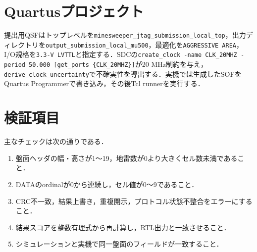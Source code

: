 \section{Quartusプロジェクト}
提出用QSFはトップレベルを\texttt{minesweeper\_jtag\_submission\_local\_top}，出力ディレクトリを\texttt{output\_submission\_local\_mu500}，最適化を\texttt{AGGRESSIVE AREA}，I/O規格を\texttt{3.3-V LVTTL}と指定する．SDCの\texttt{create\_clock -name CLK\_20MHZ -period 50.000 [get\_ports \{CLK\_20MHZ\}]}が20 MHz制約を与え，\texttt{derive\_clock\_uncertainty}で不確実性を導出する．実機では生成したSOFをQuartus Programmerで書き込み，その後Tcl runnerを実行する．

\section{検証項目}
主なチェックは次の通りである．
\begin{enumerate}
\item 盤面ヘッダの幅・高さが1～19，地雷数が0より大きくセル数未満であること．
\item DATAのordinalが0から連続し，セル値が0～9であること．
\item CRC不一致，結果上書き，重複開示，プロトコル状態不整合をエラーにすること．
\item 結果スコアを整数有理式から再計算し，RTL出力と一致させること．
\item シミュレーションと実機で同一盤面のフィールドが一致すること．
\end{enumerate}

